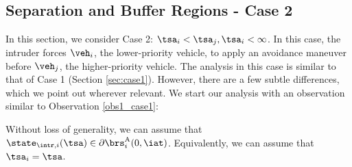 \subsection{Separation and Buffer Regions - Case 2} \label{sec:case2}
In this section, we consider Case 2: $\tsa_i < \tsa_j, \tsa_i <\infty$. In this case, the intruder forces $\veh_i$, the lower-priority vehicle, to apply an avoidance maneuver before $\veh_j$, the higher-priority vehicle. The analysis in this case is similar to that of Case 1 (Section \ref{sec:case1}). However, there are a few subtle differences, which we point out wherever relevant. We start our analysis with an observation similar to Observation \ref{obs1_case1}:
\begin{observation} \label{obs1_case2}
Without loss of generality, we can assume that $\state_{\intr, i}(\tsa) \in \partial \brs^{\text{A}}_{i}(0, \iat)$. Equivalently, we can assume that $\tsa_i = \tsa$.
\end{observation}